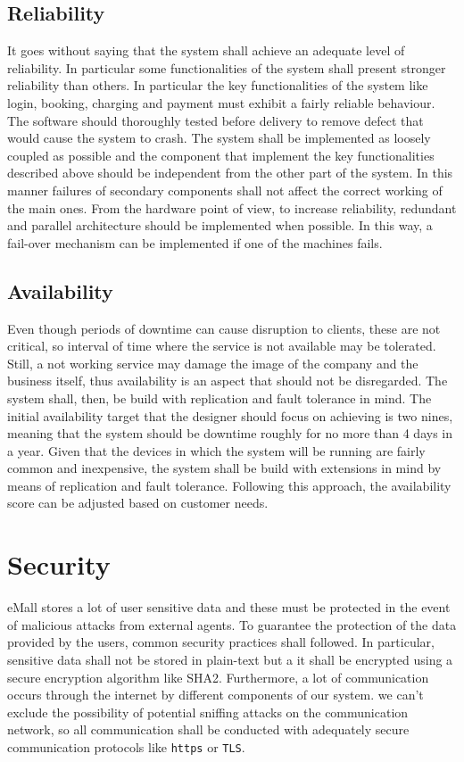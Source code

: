 \subsection{Reliability}
It goes without saying that the system shall achieve an adequate level of reliability. In particular some functionalities of the system shall present stronger reliability than others. In particular the key functionalities of the system like login, booking, charging and payment must exhibit a fairly reliable behaviour. The software should thoroughly tested before delivery to remove defect that would cause the system to crash. The system shall be implemented as loosely coupled as possible and the component that implement the key functionalities described above should be independent from the other part of the system. In this manner failures of secondary components shall not affect the correct working of the main ones. From the hardware point of view, to increase reliability, redundant and parallel architecture should be implemented when possible. In this way, a fail-over mechanism can be implemented if one of the machines fails.

\subsection{Availability}
Even though periods of downtime can cause disruption to clients, these are not critical, so interval of time where the service is not available may be tolerated. Still, a not working service may damage the image of the company and the business itself, thus availability is an aspect that should not be disregarded. The system shall, then, be build with replication and fault tolerance in mind. The initial availability target that the designer  should focus on achieving is two nines, meaning that the system should be downtime roughly for no more than 4 days in a year. Given that the devices in which the system will be running are fairly common and inexpensive, the system shall be build with extensions in mind by means of replication and fault tolerance. Following this approach, the availability score can be adjusted based on customer needs.

\section{Security}
eMall stores a lot of user sensitive data and these must be protected in the event of malicious attacks from external agents. To guarantee the protection of the data provided by the users, common security practices shall followed. In particular, sensitive data shall not be stored in plain-text but a it shall be encrypted using a secure encryption algorithm like SHA2. Furthermore, a lot of communication occurs through the internet  by different components of our system. we can't exclude the possibility of potential sniffing attacks on the communication network, so all communication shall be conducted with adequately secure communication protocols like \verb|https| or \verb|TLS|.

